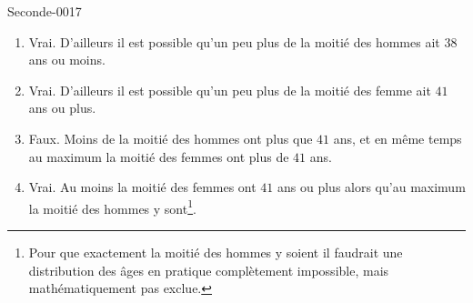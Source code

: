 
\begin{corrige}{Seconde-0017}

    \begin{enumerate}
        \item
            Vrai. D'ailleurs il est possible qu'un peu plus de la moitié des hommes ait \( 38\) ans ou moins.
        \item
            Vrai. D'ailleurs il est possible qu'un peu plus de la moitié des femme ait \( 41\) ans ou plus.
        \item
            Faux. Moins de la moitié des hommes ont plus que \( 41\) ans, et en même temps au maximum la moitié des femmes ont plus de \( 41\) ans.
        \item
            Vrai. Au moins la moitié des femmes ont \( 41\) ans ou plus alors qu'au maximum la moitié des hommes y sont\footnote{Pour que exactement la moitié des hommes y soient il faudrait une distribution des âges en pratique complètement impossible, mais mathématiquement pas exclue.}.
    \end{enumerate}

\end{corrige}
